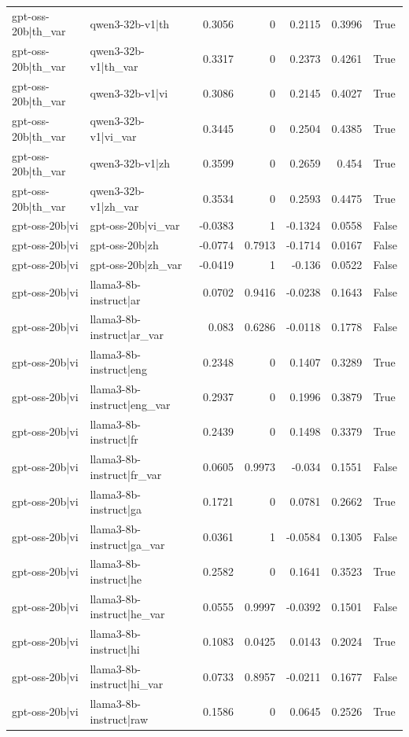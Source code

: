\begin{table}
\begin{tabular}{l l r r r r l}
gpt-oss-20b|th_var & qwen3-32b-v1|th & 0.3056 & 0 & 0.2115 & 0.3996 & True \\
gpt-oss-20b|th_var & qwen3-32b-v1|th_var & 0.3317 & 0 & 0.2373 & 0.4261 & True \\
gpt-oss-20b|th_var & qwen3-32b-v1|vi & 0.3086 & 0 & 0.2145 & 0.4027 & True \\
gpt-oss-20b|th_var & qwen3-32b-v1|vi_var & 0.3445 & 0 & 0.2504 & 0.4385 & True \\
gpt-oss-20b|th_var & qwen3-32b-v1|zh & 0.3599 & 0 & 0.2659 & 0.454 & True \\
gpt-oss-20b|th_var & qwen3-32b-v1|zh_var & 0.3534 & 0 & 0.2593 & 0.4475 & True \\
gpt-oss-20b|vi & gpt-oss-20b|vi_var & -0.0383 & 1 & -0.1324 & 0.0558 & False \\
gpt-oss-20b|vi & gpt-oss-20b|zh & -0.0774 & 0.7913 & -0.1714 & 0.0167 & False \\
gpt-oss-20b|vi & gpt-oss-20b|zh_var & -0.0419 & 1 & -0.136 & 0.0522 & False \\
gpt-oss-20b|vi & llama3-8b-instruct|ar & 0.0702 & 0.9416 & -0.0238 & 0.1643 & False \\
gpt-oss-20b|vi & llama3-8b-instruct|ar_var & 0.083 & 0.6286 & -0.0118 & 0.1778 & False \\
gpt-oss-20b|vi & llama3-8b-instruct|eng & 0.2348 & 0 & 0.1407 & 0.3289 & True \\
gpt-oss-20b|vi & llama3-8b-instruct|eng_var & 0.2937 & 0 & 0.1996 & 0.3879 & True \\
gpt-oss-20b|vi & llama3-8b-instruct|fr & 0.2439 & 0 & 0.1498 & 0.3379 & True \\
gpt-oss-20b|vi & llama3-8b-instruct|fr_var & 0.0605 & 0.9973 & -0.034 & 0.1551 & False \\
gpt-oss-20b|vi & llama3-8b-instruct|ga & 0.1721 & 0 & 0.0781 & 0.2662 & True \\
gpt-oss-20b|vi & llama3-8b-instruct|ga_var & 0.0361 & 1 & -0.0584 & 0.1305 & False \\
gpt-oss-20b|vi & llama3-8b-instruct|he & 0.2582 & 0 & 0.1641 & 0.3523 & True \\
gpt-oss-20b|vi & llama3-8b-instruct|he_var & 0.0555 & 0.9997 & -0.0392 & 0.1501 & False \\
gpt-oss-20b|vi & llama3-8b-instruct|hi & 0.1083 & 0.0425 & 0.0143 & 0.2024 & True \\
gpt-oss-20b|vi & llama3-8b-instruct|hi_var & 0.0733 & 0.8957 & -0.0211 & 0.1677 & False \\
gpt-oss-20b|vi & llama3-8b-instruct|raw & 0.1586 & 0 & 0.0645 & 0.2526 & True \\

\end{tabular}
\end{table}
